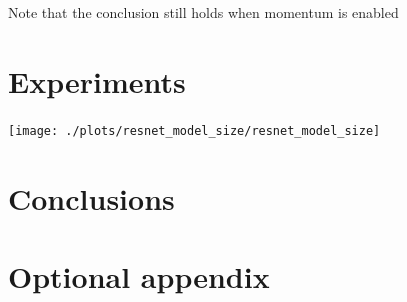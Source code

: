 \documentclass[12pt]{report}
\begin{document}
    Note that the conclusion still holds when momentum is enabled
    \chapter{Experiments}

    \texttt{[image: ./plots/resnet\_model\_size/resnet\_model\_size]}

%
%
%
%
%
%
%


    \chapter{Conclusions}


    \appendix


    \chapter{Optional appendix}

    \printbibliography
\end{document}
